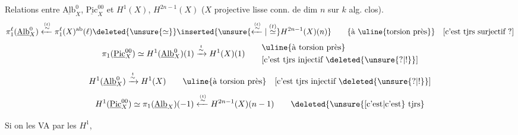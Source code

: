 Relations entre $\underline{\mathrm{Alb}}_X^0$, $\underline{\mathrm{Pic}}_X^{00}$ et $H^1(X)$, $H^{2n-1}(X)$
($X$ projective lisse conn. de dim $n$ sur $k$ alg. clos).
\[
 \pi_1^\ell(\underline{\mathrm{Alb}}_X^0)
 \xleftarrow{\overset{(t)}{\sim}}\pi_1^{\ell}(X)^{\mathrm{ab}}(\ell)
 \deleted{\unsure{\simeq}}\inserted{\unsure{\xleftarrow{\overset{(t)}{\sim}}|\overset{(t)}{\simeq}}H^{2n-1}(X)(n)}
 \qquad \{\text{à \uline{torsion près}}\}\quad
 [\text{c'est tjrs surjectif ?}]
\]
\[
 \pi_1(\underline{\mathrm{Pic}}_X^{00})\simeq H^1(\underline{\mathrm{Alb}}_X^0)(1)
 \xrightarrow{\overset{t}{\sim}}H^1(X)(1)
 \qquad \begin{aligned}&\text{\uline{à torsion près}}\\&[\text{c'est tjrs injectif \deleted{\unsure{?|!}}}]\end{aligned}
\]
\[
 H^1(\underline{\mathrm{Alb}}_X^0)\xrightarrow{\overset{t}{\sim}}H^1(X)
 \qquad \text{\uline{à torsion près}}\quad [\text{c'est tjrs injectif \deleted{\unsure{?|!}}}]
\]
\[
 H^1(\underline{\mathrm{Pic}}_X^{00})\simeq\pi_1(\underline{\mathrm{Alb}}_X)(-1)
 \xleftarrow{\overset{(t)}{\sim}}H^{2n-1}(X)(n-1)
 \qquad\text{\deleted{\unsure{[c'est|c'est} tjrs}}
\]

Si on  les VA par les $H^1$,

